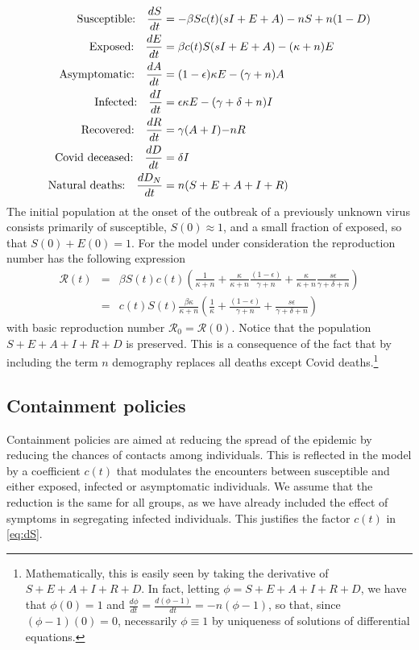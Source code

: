 \documentclass{amsart}
\begin{document}
\begin{align} 
\text{Susceptible:\quad}\frac{dS}{dt} & =-\beta S c(t)(sI+E+A)-nS +n(1-D)\label{eq:dS}\\
\text{Exposed:\quad}\frac{dE}{dt} & =\beta c(t) S(sI+E+A)-(\kappa+n)E \label{eq:dE}\\
\text{Asymptomatic:\quad}\frac{dA}{dt} & = (1-\epsilon)\kappa E
-(\gamma+ n) A \label{eq:dA}\\
\text{Infected:\quad}\frac{dI}{dt} & = \epsilon\kappa E-(\gamma+
\delta+n)I\label{eq:dI}\\
\text{Recovered:\quad}\frac{dR}{dt} & =\gamma (A+I){-n R}\label{eq:dR}\\
\text{Covid deceased:\quad}\frac{dD}{dt} & =\delta I\label{eq:dD}\\
\text{Natural deaths:\quad}\frac{dD_N}{dt} & = n(S+E+A+I+R)\label{eq:dDN}
\end{align}
The initial population at the onset of the outbreak
of a previously unknown virus
consists primarily of susceptible, $S(0) \approx 1$, and a small fraction of exposed, so that $S(0)+E(0)=1$. For the model under consideration the  reproduction number  has the following expression 
\begin{eqnarray} \label{R0}
    \mathcal{R}(t)&=&\beta S(t) c(t)\left(\frac{1}{\kappa+n}+\frac{\kappa}{\kappa+n}\frac{(1-\epsilon)}{\gamma+n}+\frac{\kappa}{\kappa+n}\frac{s \epsilon}{\gamma+\delta+n}\right)\nonumber  \\
    &=&c(t) S(t)\frac{\beta  \kappa}{\kappa+n}\left(\frac{1}{\kappa}+\frac{(1-\epsilon)}{\gamma+n}+\frac{s \epsilon}{\gamma+\delta+n}\right) 
\end{eqnarray}
with basic reproduction number
$\mathcal{R}_0 = \mathcal{R}(0)$.
Notice that the population $S+E+A+I+R+D$ is preserved. This is a consequence of
the fact that by including the term $n$ demography replaces
all deaths except Covid deaths.\footnote{Mathematically, this is
easily seen 
by taking the derivative of $S+E+A+I+R+D$. In fact, letting
$\phi=S+E+A+I+R+D$, we have that $\phi(0)=1$  and 
$\frac{d\phi}{dt}=\frac{d(\phi-1)}{dt}
=-n(\phi-1)$, so that, since $(\phi-1)(0)=0$, necessarily $\phi \equiv 1$ by uniqueness of solutions of
differential equations.}

\subsection{Containment policies }
Containment policies are aimed at reducing the spread of the 
epidemic by reducing the chances of contacts among individuals. This is reflected in the model by a coefficient $c(t)$ that modulates
the encounters between susceptible and either exposed,
infected or asymptomatic
individuals. We assume that the reduction
is the same for all groups, as we have already included the
effect of symptoms in segregating infected individuals.
This justifies the factor $c(t)$ in \eqref{eq:dS}.
\end{document}
